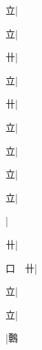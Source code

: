 \begin{multicols}{2}
{{\cjk{}{\cnsym{}　}{\cnsym{}　}立}|{}\par
{\cjk{}{\cnsym{}　}{\cnsym{}　}立}|{}\par
{\cjk{}{\cnsym{}　}{\cnsym{}　}卄}|{}\par
{\cjk{}{\cnsym{}　}{\cnsym{}　}立}|{}\par
{\cjk{}{\cnsym{}　}{\cnsym{}　}卄}|{}\par
{\cjk{}{\cnsym{}　}{\cnsym{}　}立}|{}\par
{\cjk{}{\cnsym{}　}{\cnsym{}　}立}|{}\par
{\cjk{}{\cnsym{}　}{\cnsym{}　}立}|{}\par
{\cjk{}{\cnsym{}　}{\cnsym{}　}立}|{}\par
{}|{}\par
{\cjk{}{\cnsym{}　}{\cnsym{}　}卄}|{}\par
{\cjk{}口{\cnsym{}　}卄}|{}\par
{\cjk{}{\cnsym{}　}{\cnsym{}　}立}|{}\par
{\cjk{}{\cnsym{}　}{\cnsym{}　}立}|{}\par
{}|{\cjk{}鷣}\par
}
\end{multicols}
